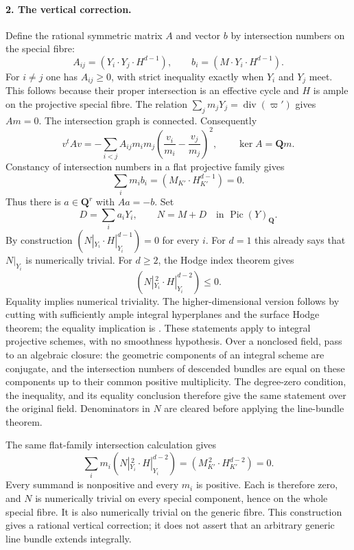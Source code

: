 \paragraph{2. The vertical correction.}
Define the rational symmetric matrix $A$ and vector $b$ by intersection
numbers on the special fibre:
\[
 A_{ij}=(Y_i\cdot Y_j\cdot H^{d-1}),\qquad
 b_i=(M\cdot Y_i\cdot H^{d-1}).                          \tag{E4.T.3}
\]
For $i\ne j$ one has $A_{ij}\geq0$, with strict inequality exactly when
$Y_i$ and $Y_j$ meet. This follows because their proper intersection is
an effective cycle and $H$ is ample on the projective special fibre.
The relation $\sum_jm_jY_j=\operatorname{div}(\varpi')$ gives $Am=0$.
The intersection graph is connected. Consequently
\[
 v^tAv=-\sum_{i<j}A_{ij}m_im_j
       \left(\frac{v_i}{m_i}-\frac{v_j}{m_j}\right)^2,
 \qquad \ker A=\mathbf Qm.                              \tag{E4.T.4}
\]
Constancy of intersection numbers in a flat projective family gives
\[
 \sum_i m_i b_i=(M_{K'}\cdot H_{K'}^{d-1})=0.
\]
Thus there is $a\in\mathbf Q^r$ with $Aa=-b$. Set
\[
 D=\sum_i a_iY_i,\qquad N=M+D\quad\text{in }\operatorname{Pic}(Y)_\mathbf Q.
                                                               \tag{E4.T.5}
\]
By construction $(N|_{Y_i}\cdot H|_{Y_i}^{d-1})=0$ for every $i$.
For $d=1$ this already says that $N|_{Y_i}$ is numerically trivial.
For $d\geq2$, the Hodge index theorem gives
\[
 (N|_{Y_i}^{\,2}\cdot H|_{Y_i}^{d-2})\leq0.             \tag{E4.T.6}
\]
Equality implies numerical triviality. The higher-dimensional version
follows by cutting with sufficiently ample integral hyperplanes and the
surface Hodge theorem; the equality implication is
\cite[Theorem~6.3(h), proof pp.~53--54, and Theorem~B.27, p.~79]{Kleiman2005}.
These statements apply to integral projective schemes, with no smoothness
hypothesis. Over a nonclosed field, pass to an algebraic closure: the
geometric components of an integral scheme are conjugate, and the
intersection numbers of descended bundles are equal on these components
up to their common positive multiplicity. The degree-zero condition,
the inequality, and its equality conclusion therefore give the same
statement over the original field. Denominators in $N$ are cleared before
applying the line-bundle theorem.

The same flat-family intersection calculation gives
\[
 \sum_i m_i(N|_{Y_i}^{\,2}\cdot H|_{Y_i}^{d-2})
       =(M_{K'}^{\,2}\cdot H_{K'}^{d-2})=0.              \tag{E4.T.7}
\]
Every summand is nonpositive and every $m_i$ is positive. Each is therefore
zero, and $N$ is numerically trivial on every special component, hence
on the whole special fibre. It is also numerically trivial on the generic
fibre. This construction gives a rational vertical correction; it does
not assert that an arbitrary generic line bundle extends integrally.

